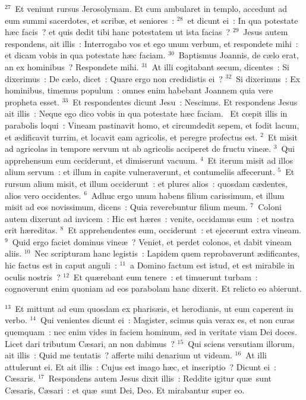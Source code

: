 ${}^{27}$~Et veniunt rursus Jerosolymam. Et cum ambularet in templo, accedunt ad eum summi sacerdotes, et scrib\ae , et seniores~:
${}^{28}$~et dicunt ei~: In qua potestate h\ae c facis~? et quis dedit tibi hanc potestatem ut ista facias~?
${}^{29}$~Jesus autem respondens, ait illis~: Interrogabo vos et ego unum verbum, et respondete mihi~: et dicam vobis in qua potestate h\ae c faciam.
${}^{30}$~Baptismus Joannis, de c\ae lo erat, an ex hominibus~? Respondete mihi.
${}^{31}$~At illi cogitabant secum, dicentes~: Si dixerimus~: De c\ae lo, dicet~: Quare ergo non credidistis ei~?
${}^{32}$~Si dixerimus~: Ex hominibus, timemus populum~: omnes enim habebant Joannem quia vere propheta esset.
${}^{33}$~Et respondentes dicunt Jesu~: Nescimus. Et respondens Jesus ait illis~: Neque ego dico vobis in qua potestate h\ae c faciam.
~Et cœpit illis in parabolis loqui~: Vineam pastinavit homo, et circumdedit sepem, et fodit lacum, et \ae dificavit turrim, et locavit eam agricolis, et peregre profectus est.
${}^{2}$~Et misit ad agricolas in tempore servum ut ab agricolis acciperet de fructu vine\ae .
${}^{3}$~Qui apprehensum eum ceciderunt, et dimiserunt vacuum.
${}^{4}$~Et iterum misit ad illos alium servum~: et illum in capite vulneraverunt, et contumeliis affecerunt.
${}^{5}$~Et rursum alium misit, et illum occiderunt~: et plures alios~: quosdam c\ae dentes, alios vero occidentes.
${}^{6}$~Adhuc ergo unum habens filium carissimum, et illum misit ad eos novissimum, dicens~: Quia reverebuntur filium meum.
${}^{7}$~Coloni autem dixerunt ad invicem~: Hic est h\ae res~: venite, occidamus eum~: et nostra erit h\ae reditas.
${}^{8}$~Et apprehendentes eum, occiderunt~: et ejecerunt extra vineam.
${}^{9}$~Quid ergo faciet dominus vine\ae~? Veniet, et perdet colonos, et dabit vineam aliis.
${}^{10}$~Nec scripturam hanc legistis~: Lapidem quem reprobaverunt \ae dificantes, hic factus est in caput anguli~:
${}^{11}$~a Domino factum est istud, et est mirabile in oculis nostris~?
${}^{12}$~Et qu\ae rebant eum tenere~: et timuerunt turbam~: cognoverunt enim quoniam ad eos parabolam hanc dixerit. Et relicto eo abierunt.


${}^{13}$~Et mittunt ad eum quosdam ex pharis\ae is, et herodianis, ut eum caperent in verbo.
${}^{14}$~Qui venientes dicunt ei~: Magister, scimus quia verax es, et non curas quemquam~: nec enim vides in faciem hominum, sed in veritate viam Dei doces. Licet dari tributum C\ae sari, an non dabimus~?
${}^{15}$~Qui sciens versutiam illorum, ait illis~: Quid me tentatis~? afferte mihi denarium ut videam.
${}^{16}$~At illi attulerunt ei. Et ait illis~: Cujus est imago h\ae c, et inscriptio~? Dicunt ei~: C\ae saris.
${}^{17}$~Respondens autem Jesus dixit illis~: Reddite igitur qu\ae\ sunt C\ae saris, C\ae sari~: et qu\ae\ sunt Dei, Deo. Et mirabantur super eo.


